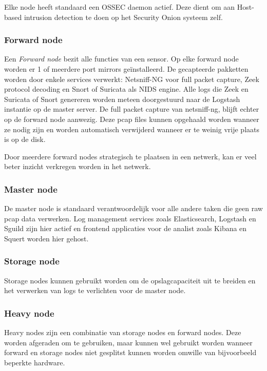 \documentclass[a4paper,12pt]{report}
\begin{document}
Elke node heeft standaard een OSSEC daemon actief.
Deze dient om aan Host-based intrusion detection te doen op het Security Onion systeem zelf.

\subsubsection{Forward node}
Een \emph{Forward node} bezit alle functies van een sensor.
Op elke forward node worden er 1 of meerdere port mirrors geïnstalleerd.
De gecapteerde pakketten worden door enkele services verwerkt: Netsniff-NG voor full packet capture, Zeek protocol decoding en Snort of Suricata als NIDS engine.
Alle logs die Zeek en Suricata of Snort genereren worden meteen doorgestuurd naar de Logstash instantie op de master server.
De full packet capture van netsniff-ng, blijft echter op de forward node aanwezig.
Deze pcap files kunnen opgehaald worden wanneer ze nodig zijn en worden automatisch verwijderd wanneer er te weinig vrije plaats is op de disk.

Door meerdere forward nodes strategisch te plaatsen in een netwerk, kan er veel beter inzicht verkregen worden in het netwerk.

\subsubsection{Master node}
De master node is standaard verantwoordelijk voor alle andere taken die geen raw pcap data verwerken.
Log management services zoals Elasticsearch, Logstash en Sguild zijn hier actief en frontend applicaties voor de analist zoals Kibana en Squert worden hier gehost.

\subsubsection{Storage node}
Storage nodes kunnen gebruikt worden om de opslagcapaciteit uit te breiden en het verwerken van logs te verlichten voor de master node.

\subsubsection{Heavy node}
Heavy nodes zijn een combinatie van storage nodes en forward nodes.
Deze worden afgeraden om te gebruiken, maar kunnen wel gebruikt worden wanneer forward en storage nodes niet gesplitst kunnen worden omwille van bijvoorbeeld beperkte hardware.

\autocite{so:docs}
\end{document}
